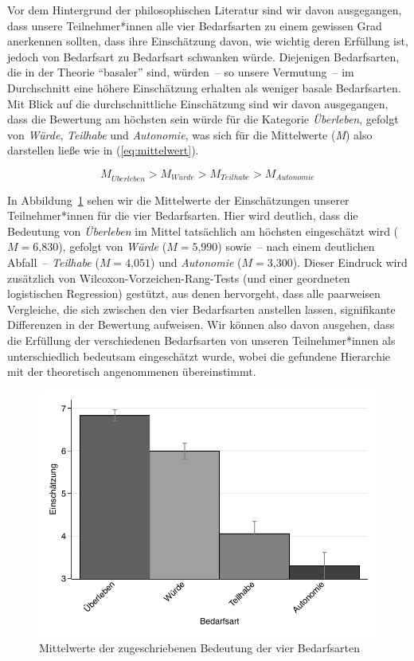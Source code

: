 \documentclass[justified,nobib,nohyper,symmetric,twoside]{tufte-book}
\begin{document}
Vor dem Hintergrund der philosophischen Literatur sind wir davon ausgegangen, dass unsere Teilnehmer*innen alle vier Bedarfsarten zu einem gewissen Grad anerkennen sollten, dass ihre Einschätzung davon, wie wichtig deren Erfüllung ist, jedoch von Bedarfsart zu Bedarfsart schwanken würde.
Diejenigen Bedarfsarten, die in der Theorie \enquote{basaler} sind, würden~-- so unsere Vermutung~-- im Durchschnitt eine höhere Einschätzung erhalten als weniger basale Bedarfsarten.
Mit Blick auf die durchschnittliche Einschätzung sind wir davon ausgegangen, dass die Bewertung am höchsten sein würde für die Kategorie \textit{Überleben}, gefolgt von \textit{Würde}, \textit{Teilhabe} und \textit{Autonomie}, was sich für die Mittelwerte (\textit{M}) also darstellen ließe wie in (\ref{eq:mittelwert}).

\begin{equation}\label{eq:mittelwert}
   M_{\ddot{U}berleben}>M_{W\ddot{u}rde}>M_{Teilhabe}>M_{Autonomie}
\end{equation}

In Abbildung~\ref{fig:abbildung_15} sehen wir die Mittelwerte der Einschätzungen unserer Teilnehmer*innen für die vier Bedarfsarten.
Hier wird deutlich, dass die Bedeutung von \textit{Überleben} im Mittel tatsächlich am höchsten eingeschätzt wird ($M = \textrm{6,830}$), gefolgt von \textit{Würde} ($M = \textrm{5,990}$) sowie~-- nach einem deutlichen Abfall~-- \textit{Teilhabe} ($M = \textrm{4,051}$) und \textit{Autonomie} ($M = \textrm{3,300}$).
Dieser Eindruck wird zusätzlich von Wilcoxon-Vorzeichen-Rang-Tests (und einer geordneten logistischen Regression) gestützt, aus denen hervorgeht, dass alle paarweisen Vergleiche, die sich zwischen den vier Bedarfsarten anstellen lassen, signifikante Differenzen in der Bewertung aufweisen.
Wir können also davon ausgehen, dass die Erfüllung der verschiedenen Bedarfsarten von unseren Teilnehmer*innen als unterschiedlich bedeutsam eingeschätzt wurde, wobei die gefundene Hierarchie mit der theoretisch angenommenen übereinstimmt.

\begin{figure}[t]\label{fig:abbildung_15}
   \includegraphics[width=0.99\linewidth]{figure_15.pdf}
   \caption{Mittelwerte der zugeschriebenen Bedeutung der vier Bedarfsarten}
\end{figure}
\end{document}
